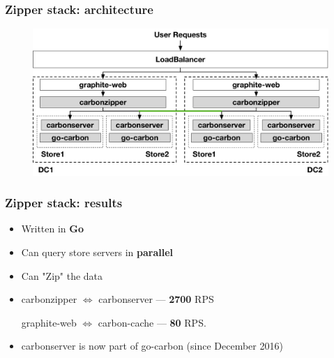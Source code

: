 \documentclass[aspectratio=43, unicode, notheorems, xcolor={dvipsnames}]{beamer}
\newcommand{\bs}[1]{\textbf{\textcolor{BookingBlue}{#1}}}
\begin{document}

\begin{frame}
	\frametitle{Zipper stack: architecture}
	\begin{figure}[h]
		\begin{center}
			\includegraphics[width=1.05\columnwidth]{graphite-zipper}
		\end{center}
	\end{figure}
\end{frame}

\begin{frame}
	\frametitle{Zipper stack: results}
	\Large{
	\begin{itemize}
	\item Written in \bs{Go}
	\item Can query store servers in \bs{parallel}
	\item Can "Zip" the data
	\item carbonzipper $\Leftrightarrow$ carbonserver --- \bs{2700} RPS

	graphite-web $\Leftrightarrow$ carbon-cache --- \bs{80} RPS.

	\item carbonserver is now part of go-carbon (since December 2016)

	\end{itemize}
	}
\end{frame}
\end{document}
